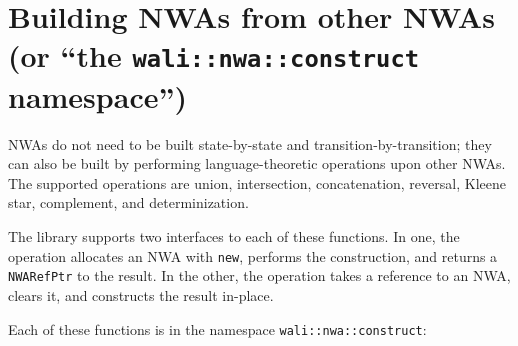 \section{Building NWAs from other NWAs (or ``the \texttt{wali::nwa::construct} namespace'')}
\label{Se:Building NWAs}

NWAs do not need to be built state-by-state and transition-by-transition;
they can also be built by performing language-theoretic operations upon
other NWAs. The supported operations are union, intersection, concatenation,
reversal, Kleene star, complement, and determinization.

The library supports two interfaces to each of these functions. In one, the
operation allocates an NWA with \texttt{new}, performs the construction, and
returns a \texttt{NWARefPtr} to the result.  In the other, the operation takes
a reference to an NWA, clears it, and constructs the result in-place.

Each of these functions is in the namespace \texttt{wali::nwa::construct}:

